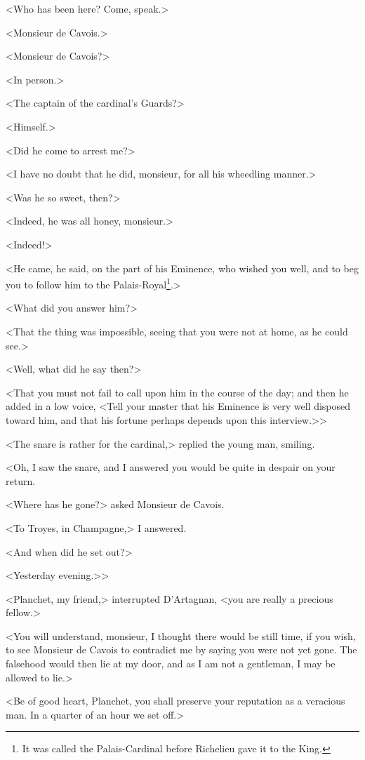 <Who has been here? Come, speak.> 

<Monsieur de Cavois.> 

<Monsieur de Cavois?> 

<In person.> 

<The captain of the cardinal's Guards?> 

<Himself.> 

<Did he come to arrest me?> 

<I have no doubt that he did, monsieur, for all his wheedling manner.> 

<Was he so sweet, then?> 

<Indeed, he was all honey, monsieur.> 

<Indeed!> 

<He came, he said, on the part of his Eminence, who wished you well, and to beg you to follow him to the Palais-Royal\footnote{It was called the Palais-Cardinal before Richelieu gave it to the King.}.> 

<What did you answer him?> 

<That the thing was impossible, seeing that you were not at home, as he could see.> 

<Well, what did he say then?> 

<That you must not fail to call upon him in the course of the day; and then he added in a low voice, <Tell your master that his Eminence is very well disposed toward him, and that his fortune perhaps depends upon this interview.>> 

<The snare is rather  for the cardinal,> replied the young man, smiling. 

<Oh, I saw the snare, and I answered you would be quite in despair on your return. 

<Where has he gone?> asked Monsieur de Cavois. 

<To Troyes, in Champagne,> I answered. 

<And when did he set out?>

<Yesterday evening.>>

<Planchet, my friend,> interrupted D'Artagnan, <you are really a precious fellow.> 

<You will understand, monsieur, I thought there would be still time, if you wish, to see Monsieur de Cavois to contradict me by saying you were not yet gone. The falsehood would then lie at my door, and as I am not a gentleman, I may be allowed to lie.> 

<Be of good heart, Planchet, you shall preserve your reputation as a veracious man. In a quarter of an hour we set off.> 

